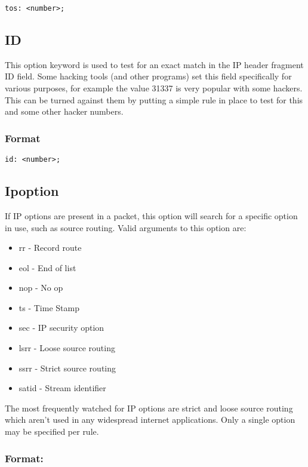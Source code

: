 \documentclass[english]{report}
\begin{document}
\begin{verbatim}
tos: <number>;
\end{verbatim}

\subsection{ID}

This option keyword is used to test for an exact match in the IP header
fragment ID field. Some hacking tools (and other programs) set this
field specifically for various purposes, for example the value 31337
is very popular with some hackers. This can be turned against them
by putting a simple rule in place to test for this and some other
hacker numbers.


\subsubsection{Format}

\begin{verbatim}
id: <number>;
\end{verbatim}

\subsection{Ipoption}

If IP options are present in a packet, this option will search for
a specific option in use, such as source routing. Valid arguments
to this option are: 

\begin{itemize}
\item rr - Record route 
\item eol - End of list 
\item nop - No op 
\item ts - Time Stamp 
\item sec - IP security option 
\item lsrr - Loose source routing 
\item ssrr - Strict source routing 
\item satid - Stream identifier
\end{itemize}
The most frequently watched for IP options are strict and loose source
routing which aren't used in any widespread internet applications.
Only a single option may be specified per rule.


\subsubsection{Format:}
\end{document}
